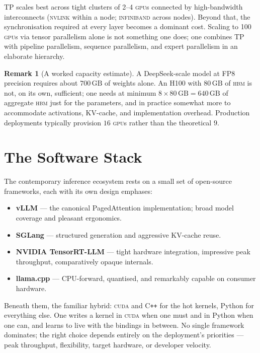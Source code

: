 \documentclass[11pt,a4paper]{article}
\theoremstyle{definition}
\newtheorem{remark}[definition]{Remark}
\theoremstyle{plain}
\newcommand{\HBM}{\textsc{hbm}}
\newcommand{\GPU}{\textsc{gpu}}
\begin{document}
TP scales best across tight clusters of 2--4 \GPU{}s connected by high-bandwidth interconnects (\textsc{nvlink} within a node; \textsc{infiniband} across nodes). Beyond that, the synchronisation required at every layer becomes a dominant cost. Scaling to 100 \GPU{}s via tensor parallelism alone is not something one does; one combines TP with pipeline parallelism, sequence parallelism, and expert parallelism in an elaborate hierarchy.

\begin{remark}[A worked capacity estimate]
A DeepSeek-scale model at FP8 precision requires about $700\,\text{GB}$ of weights alone. An H100 with $80\,\text{GB}$ of \HBM{} is not, on its own, sufficient; one needs at minimum $8\times 80\,\text{GB} = 640\,\text{GB}$ of aggregate \HBM{} just for the parameters, and in practice somewhat more to accommodate activations, KV-cache, and implementation overhead. Production deployments typically provision $16$ \GPU{}s rather than the theoretical $9$.
\end{remark}

\section{The Software Stack}

The contemporary inference ecosystem rests on a small set of open-source frameworks, each with its own design emphases:

\begin{itemize}[leftmargin=*,itemsep=2pt]
    \item \textbf{vLLM} --- the canonical PagedAttention implementation; broad model coverage and pleasant ergonomics.
    \item \textbf{SGLang} --- structured generation and aggressive KV-cache reuse.
    \item \textbf{NVIDIA TensorRT-LLM} --- tight hardware integration, impressive peak throughput, comparatively opaque internals.
    \item \textbf{llama.cpp} --- CPU-forward, quantised, and remarkably capable on consumer hardware.
\end{itemize}

Beneath them, the familiar hybrid: \textsc{cuda} and C\texttt{++} for the hot kernels, Python for everything else. One writes a kernel in \textsc{cuda} when one must and in Python when one can, and learns to live with the bindings in between. No single framework dominates; the right choice depends entirely on the deployment's priorities --- peak throughput, flexibility, target hardware, or developer velocity.
\end{document}
